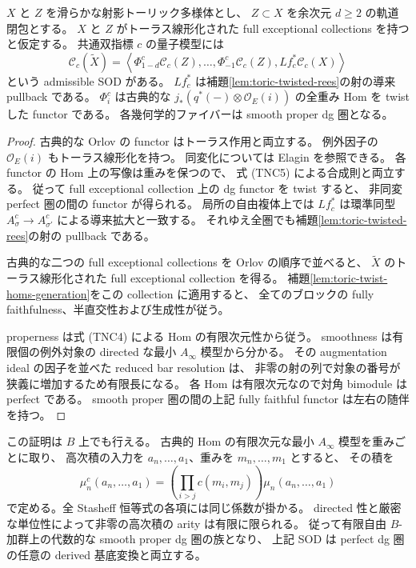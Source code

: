 \begin{theorem}\label{thm:toric-nc-orlov}
$X$ と $Z$ を滑らかな射影トーリック多様体とし、
$Z\subset X$ を余次元 $d\geq2$ の軌道閉包とする。
$X$ と $Z$ がトーラス線形化された full exceptional collections を持つと仮定する。
共通双指標 $c$ の量子模型には
\[
 \mathcal C_c(\widetilde X)
 =
 \left\langle
 \Phi^c_{1-d}\mathcal C_c(Z),\ldots,
 \Phi^c_{-1}\mathcal C_c(Z),
 Lf_c^*\mathcal C_c(X)
 \right\rangle
 \tag{TNC7}
\]
という admissible SOD がある。
$Lf_c^*$ は補題\ref{lem:toric-twisted-rees}の射の導来 pullback である。
$\Phi^c_i$ は古典的な
$j_*(q^*(-)\otimes\mathcal O_E(i))$ の全重み Hom を twist した functor である。
各幾何学的ファイバーは smooth proper dg 圏となる。
\end{theorem}
\begin{proof}
古典的な Orlov の functor はトーラス作用と両立する。
例外因子の $\mathcal O_E(i)$ もトーラス線形化を持つ。
同変化については Elagin \cite[定理10.2]{ToricElagin} を参照できる。
各 functor の Hom 上の写像は重みを保つので、
式 (TNC5) による合成則と両立する。
従って full exceptional collection 上の dg functor を twist すると、
非同変 perfect 圏の間の functor が得られる。
局所の自由複体上では $Lf_c^*$ は環準同型
$A_\sigma^c\to A_{\sigma'}^c$ による導来拡大と一致する。
それゆえ全圏でも補題\ref{lem:toric-twisted-rees}の射の pullback である。

古典的な二つの full exceptional collections を Orlov の順序で並べると、
$\widetilde X$ のトーラス線形化された full exceptional collection を得る。
補題\ref{lem:toric-twist-homs-generation}をこの collection に適用すると、
全てのブロックの fully faithfulness、半直交性および生成性が従う。

properness は式 (TNC4) による Hom の有限次元性から従う。
smoothness は有限個の例外対象の directed な最小 $A_\infty$ 模型から分かる。
その augmentation ideal の因子を並べた reduced bar resolution は、
非零の射の列で対象の番号が狭義に増加するため有限長になる。
各 Hom は有限次元なので対角 bimodule は perfect である。
smooth proper 圏の間の上記 fully faithful functor は左右の随伴を持つ。
\end{proof}

この証明は $B$ 上でも行える。
古典的 Hom の有限次元な最小 $A_\infty$ 模型を重みごとに取り、
高次積の入力を $a_n,\ldots,a_1$、重みを $m_n,\ldots,m_1$ とすると、
その積を
\[
 \mu_n^c(a_n,\ldots,a_1)
 =
 \left(\prod_{i>j}c(m_i,m_j)\right)
 \mu_n(a_n,\ldots,a_1)
 \tag{TNC8}
\]
で定める。全 Stasheff 恒等式の各項には同じ係数が掛かる。
directed 性と厳密な単位性によって非零の高次積の arity は有限に限られる。
従って有限自由 $B$-加群上の代数的な smooth proper dg 圏の族となり、
上記 SOD は perfect dg 圏の任意の derived 基底変換と両立する。

